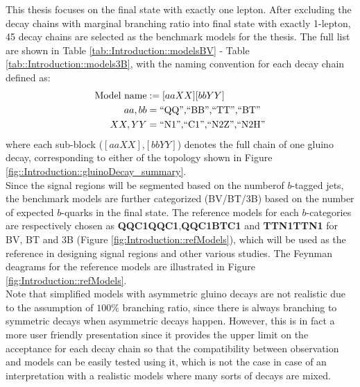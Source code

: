 This thesis focuses on the final state with exactly one lepton. 
After excluding the decay chains with marginal branching ratio into final state with exactly 1-lepton,
45 decay chains are selected as the benchmark models for the thesis.
The full list are shown in Table \ref{tab::Introduction::modelsBV} - Table \ref{tab::Introduction::models3B}, with the naming convention for each decay chain defined as:
\begin{align}
  \mbox{Model name} & := [aaXX][bbYY]  \nonumber \\
  aa,bb & = \mbox{``QQ'',``BB'',``TT'',``BT''}  \nonumber \\
  XX,YY & = \mbox{``N1'',``C1'',``N2Z'',``N2H''}
\end{align}
where each sub-block ($[aaXX]$,$[bbYY]$) denotes the full chain of one gluino decay, corresponding to either of the topology shown in Figure \ref{fig::Introduction::gluinoDecay_summary}. \\

Since the signal regions will be segmented based on the numberof $b$-tagged jets,
the benchmark models are further categorized (BV/BT/3B) based on the number of expected $b$-quarks in the final state. The reference models for each $b$-categories are respectively chosen as \textbf{QQC1QQC1},\textbf{QQC1BTC1} and \textbf{TTN1TTN1} for BV, BT and 3B (Figure \ref{fig:Introduction::refModels}), which will be used as the reference in designing signal regions and other various studies. The Feynman deagrams for the reference models are illustrated in Figure \ref{fig:Introduction::refModels}.\\

Note that simplified models with asymmetric gluino decays are not realistic due to the assumption of $100\%$ branching ratio, since there is always branching to symmetric decays when asymmetric decays happen. However, this is in fact a more user friendly presentation since it provides the upper limit on the acceptance for each decay chain so that the compatibility between observation and models can be easily tested using it, which is not the case in case of an interpretation with a realistic models where many sorts of decays are mixed.


